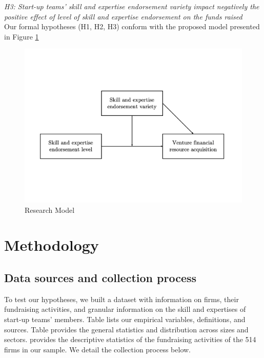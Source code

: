 \documentclass[12pt]{article}
\begin{document}
\noindent \textit{H3: Start-up teams' skill and expertise endorsement variety impact negatively the positive effect of level of skill and expertise endorsement on the funds raised} \\

Our formal hypotheses (H1, H2, H3) conform with the proposed model presented in Figure \ref{Figure1}

\begin{figure}[!b]
  \includegraphics[width=\linewidth, scale=0.5]{model.pdf}
  \caption{Research Model}
  \label{Figure1}
\end{figure}

\section{Methodology}

\subsection{Data sources and collection process}

To test our hypotheses, we built a dataset with information on firms, their fundraising activities, and granular information on the skill and expertises of start-up teams' members. Table \label{table1} lists our empirical variables, definitions, and sources. Table \label{table2} provides the general statistics and distribution across sizes and sectors. \label{table3} provides the descriptive statistics of the fundraising activities of the 514 firms in our sample. We detail the collection process below. \\
\end{document}
